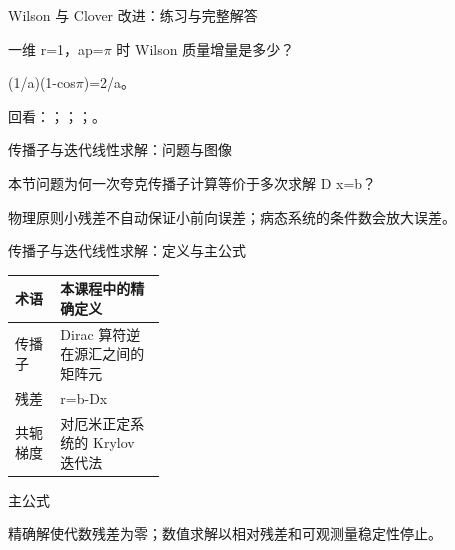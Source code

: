 \begin{frame}[t]{Wilson 与 Clover 改进：练习与完整解答}
\footnotesize
\begin{block}{}一维 r=1，ap=\ensuremath{\pi} 时 Wilson 质量增量是多少？\end{block}
\begin{exampleblock}{}(1/\allowbreak{}a)(1-cos\ensuremath{\pi})=2/\allowbreak{}a。\end{exampleblock}
\vfill
\scriptsize 回看：；；；。
\end{frame}

\begin{frame}[t]{传播子与迭代线性求解：问题与图像}
\footnotesize
\begin{block}{本节问题}为何一次夸克传播子计算等价于多次求解 D x=b？\end{block}
\begin{block}{物理原则}\quad 小残差不自动保证小前向误差；病态系统的条件数会放大误差。\end{block}
\end{frame}

\begin{frame}[t]{传播子与迭代线性求解：定义与主公式}
\footnotesize\begin{tabularx}{\linewidth}{p{0.30\linewidth}Y}
\toprule 术语 & 本课程中的精确定义\\\midrule
{} 传播子 & Dirac 算符逆在源汇之间的矩阵元\\
 残差 & r=b-Dx\\
 共轭梯度 & 对厄米正定系统的 Krylov 迭代法\\
\bottomrule\end{tabularx}\vspace{0.15cm}
\begin{block}{ 主公式}\centering{}\end{block}
精确解使代数残差为零；数值求解以相对残差和可观测量稳定性停止。
\end{frame}

